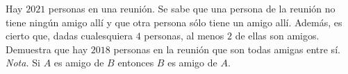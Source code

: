 Hay $2021$ personas en una reunión. Se sabe que una persona de la reunión no tiene ningún amigo allí y que otra persona sólo tiene un amigo allí. Además, es cierto que, dadas cualesquiera $4$ personas, al menos $2$ de ellas son amigos. Demuestra que hay $2018$ personas en la reunión que son todas amigas entre sí. 
\textit{Nota.} Si $A$ es amigo de $B$ entonces $B$ es amigo de $A$.
